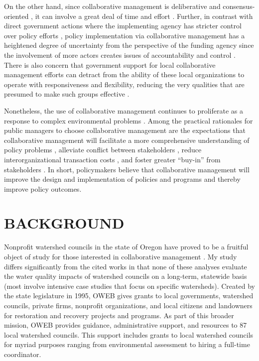 \documentclass[12pt,a4paper,titlepage]{article}
\begin{document}
On the other hand, since collaborative management is deliberative and consensus-oriented \parencite{ansell2008}, it can involve a great deal of time and effort \parencite{margerum2011}. Further, in contrast with direct government actions where the implementing agency has stricter control over policy efforts \parencite{salamon2002}, policy implementation via collaborative management has a heightened degree of uncertainty from the perspective of the funding agency since the involvement of more actors creates issues of accountability and control \parencite{weber2003}. There is also concern that government support for local collaborative management efforts can detract from the ability of these local organizations to operate with responsiveness and flexibility, reducing the very qualities that are presumed to make such groups effective \parencite{smith2004,nikolic2008}.

Nonetheless, the use of collaborative management continues to proliferate \parencite{ansell2008,emerson2012} as a response to complex environmental problems \parencite{margerum2011}. Among the practical rationales for public managers to choose collaborative management are the expectations that collaborative management will facilitate a more comprehensive understanding of policy problems \parencite{leach2013}, alleviate conflict between stakeholders \parencite{berardo2014}, reduce interorganizational transaction costs \parencite{emerson2012}, and foster greater “buy-in” from stakeholders \parencite{ansell2008}. In short, policymakers believe that collaborative management will improve the design and implementation of policies and programs and thereby improve policy outcomes.

\section*{\bf\MakeUppercase{Background}}

Nonprofit watershed councils in the state of Oregon have proved to be a fruitful object of study for those interested in collaborative management \parencite{griffin1999,dakins2005,margerum2002,margerum2007,margerum2008,margerum2011,habron2003,margerum2004,hibbard2006, lurie2008}. My study differs significantly from the cited works in that none of these analyses evaluate the water quality impacts of watershed councils on a long-term, statewide basis (most involve intensive case studies that focus on specific watersheds). Created by the state legislature in 1995, OWEB gives grants to local governments, watershed councils, private firms, nonprofit organizations, and local citizens and landowners for restoration and recovery projects and programs. As part of this broader mission, OWEB provides guidance, administrative support, and resources to 87 local watershed councils. This support includes grants to local watershed councils for myriad purposes ranging from environmental assessment to hiring a full-time coordinator.
\end{document}
